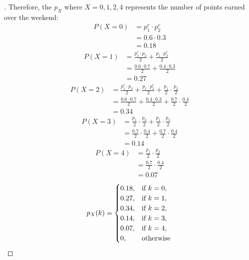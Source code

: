 \documentclass[paper=usletter, fontsize=12pt]{article}
\begin{document}
\begin{enumerate}
\begin{proof}[\unskip\nopunct]
            Therefore, the $p_X$ where $X=0,1,2,4$ represents the number of points earned over the weekend:
            \begin{align*}
                P(X=0) & = p_1^c \cdot p_2^c\\
                & = 0.6 \cdot 0.3\\
                & = 0.18
            \end{align*}
            \begingroup
            \addtolength{\jot}{1em}
            \begin{align*}
                P(X=1) & = \frac{p_1^c \cdot p_2}{2} + \frac{p_1 \cdot
                p_2^c}{2}\\
                & = \frac{0.6 \cdot 0.7}{2} + \frac{0.4 \cdot 0.3}{2}\\
                & = 0.27
            \end{align*}
            \begin{align*}
                P(X=2) & = \frac{p_1^c \cdot p_2}{2} + \frac{p_1 \cdot
                p_2^c}{2} + \frac{p_1}{2} \cdot \frac{p_2}{2}\\
                & = \frac{0.6 \cdot 0.7}{2} + \frac{0.4 \cdot 0.3}{2} + \frac{0.7}{2} \cdot \frac{0.4}{2}\\
                & = 0.34
            \end{align*}
            \begin{align*}
                P(X=3) & = \frac{p_1}{2} \cdot \frac{p_2}{2} + \frac{p_1}{2} \cdot \frac{p_2}{2}\\
                & = \frac{0.7}{2} \cdot \frac{0.4}{2} + \frac{0.7}{2} \cdot \frac{0.4}{2}\\
                & = 0.14
            \end{align*}
            \begin{align*}
                P(X=4) & = \frac{p_1}{2} \cdot \frac{p_2}{2}\\
                & = \frac{0.7}{2} \cdot \frac{0.4}{2}\\
                & = 0.07
            \end{align*}
            \endgroup
            \begin{equation*}
                p_X(k) =
                \begin{cases}
                    0.18, & \text{if}\ k = 0,\\
                    0.27, & \text{if}\ k = 1,\\
                    0.34, & \text{if}\ k = 2,\\
                    0.14, & \text{if}\ k = 3,\\
                    0.07, & \text{if}\ k = 4,\\
                    0, & \text{otherwise}
                \end{cases} \qedhere
            \end{equation*}
        \end{proof}
        \vspace{0.2in}


\end{enumerate}
\end{document}
